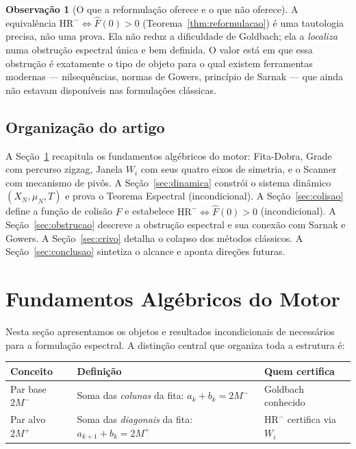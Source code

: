 \documentclass[12pt,a4paper]{article}
\theoremstyle{definition}
\newtheorem{remark}[theorem]{Observação}
\newcommand{\HRm}{\mathrm{HR}^{-}}
\begin{document}
	\begin{remark}[O que a reformulação oferece e o que não oferece]
		\label{rem:honestidade}
		A equivalência $\HRm \Leftrightarrow \widehat{F}(0) > 0$
		(Teorema~\ref{thm:reformulacao}) é uma tautologia precisa, não
		uma prova. Ela não reduz a dificuldade de Goldbach; ela a
		\emph{localiza} numa obstrução espectral única e bem definida.
		O valor está em que essa obstrução é exatamente o tipo de objeto
		para o qual existem ferramentas modernas — nilsequências, normas
		de Gowers, princípio de Sarnak — que ainda não estavam disponíveis
		nas formulações clássicas.
	\end{remark}
	
	\subsection{Organização do artigo}
	
	A Seção~\ref{sec:fundamentos} recapitula os fundamentos algébricos
	do motor: Fita-Dobra, Grade com percurso zigzag, Janela $W_i$ com
	seus quatro eixos de simetria, e o Scanner com mecanismo de pivôs.
	A Seção~\ref{sec:dinamica} constrói o sistema dinâmico
	$(X_N, \mu_N, T)$ e prova o Teorema Espectral (incondicional).
	A Seção~\ref{sec:colisao} define a função de colisão $F$ e
	estabelece $\HRm \Leftrightarrow \widehat{F}(0) > 0$
	(incondicional). A Seção~\ref{sec:obstrucao} descreve a obstrução
	espectral e sua conexão com Sarnak e Gowers. A
	Seção~\ref{sec:crivo} detalha o colapso dos métodos clássicos. A
	Seção~\ref{sec:conclusao} sintetiza o alcance e aponta direções
	futuras.
	
	\section{Fundamentos Algébricos do Motor}
	\label{sec:fundamentos}
	
	Nesta seção apresentamos os objetos e resultados incondicionais de
	\cite{motor} necessários para a formulação espectral. A distinção
	central que organiza toda a estrutura é:
	
	\begin{center}
		\renewcommand{\arraystretch}{1.4}
		\begin{tabular}{lll}
			\toprule
			\textbf{Conceito} & \textbf{Definição} & \textbf{Quem certifica} \\
			\midrule
			Par base $2M^-$ & Soma das \emph{colunas} da fita: $a_k + b_k = 2M^-$
			& Goldbach conhecido \\
			Par alvo $2M^+$ & Soma das \emph{diagonais} da fita:
			$a_{k+1} + b_k = 2M^+$
			& $\HRm$ certifica via $W_i$ \\
			\bottomrule
		\end{tabular}
	\end{center}
	
\end{document}

